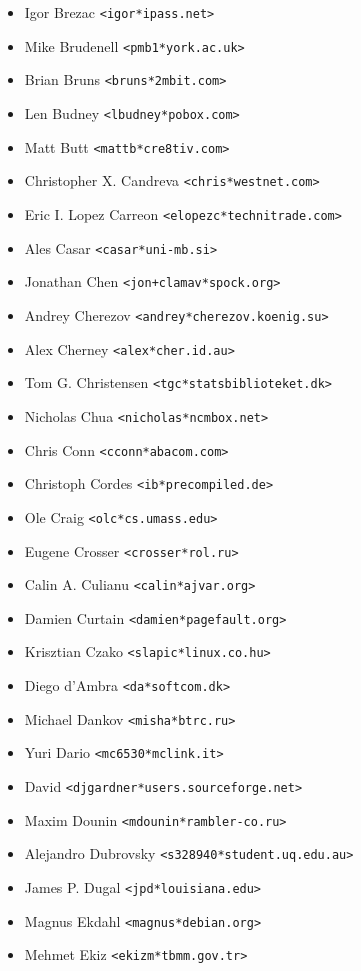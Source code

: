 \documentclass[a4paper,titlepage,12pt]{article}
\newcommand{\email}[1]{\texttt{#1}}
\begin{document}
\begin{itemize}
	\item Igor Brezac \email{<igor*ipass.net>}
	\item Mike Brudenell \email{<pmb1*york.ac.uk>}
	\item Brian Bruns \email{<bruns*2mbit.com>}
	\item Len Budney \email{<lbudney*pobox.com>}
	\item Matt Butt \email{<mattb*cre8tiv.com>}
	\item Christopher X. Candreva \email{<chris*westnet.com>}
	\item Eric I. Lopez Carreon \email{<elopezc*technitrade.com>}
	\item Ales Casar \email{<casar*uni-mb.si>}
	\item Jonathan Chen \email{<jon+clamav*spock.org>}
	\item Andrey Cherezov \email{<andrey*cherezov.koenig.su>}
	\item Alex Cherney \email{<alex*cher.id.au>}
	\item Tom G. Christensen \email{<tgc*statsbiblioteket.dk>}
	\item Nicholas Chua \email{<nicholas*ncmbox.net>}
	\item Chris Conn \email{<cconn*abacom.com>}
	\item Christoph Cordes \email{<ib*precompiled.de>}
	\item Ole Craig \email{<olc*cs.umass.edu>}
	\item Eugene Crosser \email{<crosser*rol.ru>}
	\item Calin A. Culianu \email{<calin*ajvar.org>}
	\item Damien Curtain \email{<damien*pagefault.org>}
	\item Krisztian Czako \email{<slapic*linux.co.hu>}
	\item Diego d'Ambra \email{<da*softcom.dk>}
	\item Michael Dankov \email{<misha*btrc.ru>}
	\item Yuri Dario \email{<mc6530*mclink.it>}
	\item David \email{<djgardner*users.sourceforge.net>}
	\item Maxim Dounin \email{<mdounin*rambler-co.ru>}
	\item Alejandro Dubrovsky \email{<s328940*student.uq.edu.au>}
	\item James P. Dugal \email{<jpd*louisiana.edu>}
	\item Magnus Ekdahl \email{<magnus*debian.org>}
	\item Mehmet Ekiz \email{<ekizm*tbmm.gov.tr>}

\end{itemize}
\end{document}
